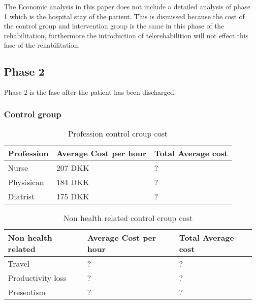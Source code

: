 The Economic analysis in this paper does not include a detailed analysis of phase 1 which is the hospital stay of the patient. This is dismissed because the cost of the control group and intervention group is the same in this phase of the rehabilitation, furthermore the introduction of telerehabilition will not effect this fase of the rehabilitation. 


\subsection{Phase 2}

Phase 2 is the fase after the patient has been discharged. 

\subsubsection{Control group}
\begin{table}[H]
\begin{longtabu} to 
    \textbf{Profession} &        \textbf{Average Cost per hour} & \textbf{Total Average cost} \\[-1ex]
    \midrule
     Nurse   &    207 DKK & ? \\ \hline
    Physisican   &   184 DKK    & ? \\ \hline
    Diatrist    &     175 DKK    & ?
    \newline
   \end{longtabu}
\caption{Profession control croup cost \cite{lonnurse, lonfys, londia}}
\label{tab: PC}
\end{table}

\begin{table}[H]
\begin{longtabu} to 
    \textbf{Non health related} &        \textbf{Average Cost per hour} & \textbf{Total Average cost} \\[-1ex]
    \midrule
     Travel   &    ? & ? \\ \hline
     Productivity loss   &       ? & ? \\ \hline
     Presentism   &        ? & ?
    \newline
   \end{longtabu}
\caption{Non health related control croup cost}
\label{tab: NC}
\end{table}

